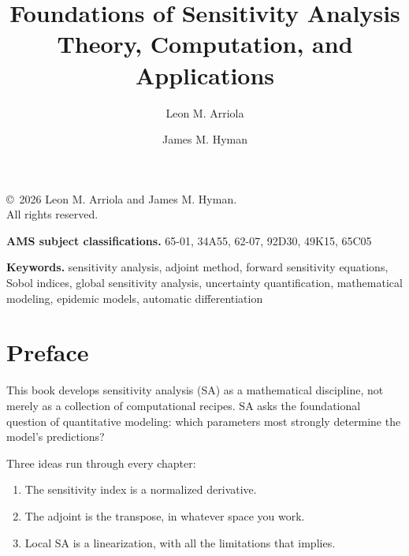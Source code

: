 \documentclass[12pt]{book}
\title{%
  \textbf{Foundations of Sensitivity Analysis}\\[6pt]
  \large Theory, Computation, and Applications
}
\author{Leon M. Arriola \and James M. Hyman}
\date{}
\begin{document}

\frontmatter

\maketitle

\thispagestyle{empty}
\vspace*{\fill}
\begin{center}
\small
\copyright\ 2026 Leon M. Arriola and James M. Hyman.\\
All rights reserved.
\end{center}
\vspace*{\fill}
\clearpage

\thispagestyle{empty}
\vspace*{\fill}
\begin{flushleft}\small
\textbf{AMS subject classifications.}
65-01,
34A55,
62-07,
92D30,
49K15,
65C05

\medskip
\textbf{Keywords.}
sensitivity analysis,
adjoint method,
forward sensitivity equations,
Sobol indices,
global sensitivity analysis,
uncertainty quantification,
mathematical modeling,
epidemic models,
automatic differentiation
\end{flushleft}
\vspace*{\fill}
\clearpage

\tableofcontents
\clearpage

\chapter*{Preface}

This book develops sensitivity analysis (SA) as a mathematical discipline,
not merely as a collection of computational recipes.
SA asks the foundational question of quantitative modeling:
which parameters most strongly determine the model's predictions?

\medskip

Three ideas run through every chapter:
\begin{enumerate}[nosep]
  \item The sensitivity index is a normalized derivative.
  \item The adjoint is the transpose, in whatever space you work.
  \item Local SA is a linearization, with all the limitations that implies.
\end{enumerate}
\end{document}
